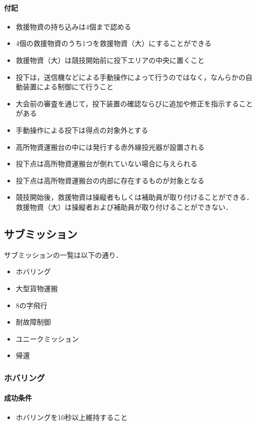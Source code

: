 \paragraph{付記}
\begin{itemize}
\item 救援物資の持ち込みは4個まで認める
\item 4個の救援物資のうち1つを救援物資（大）にすることができる
\item 救援物資（大）は競技開始前に投下エリアの中央に置くこと
\item 投下は，送信機などによる手動操作によって行うのではなく，なんらかの自動装置による制御にて行うこと
\item 大会前の審査を通じて，投下装置の確認ならびに追加や修正を指示することがある
\item 手動操作による投下は得点の対象外とする
\item 高所物資運搬台の中には発行する赤外線投光器が設置される
\item 投下点は高所物資運搬台が倒れていない場合に与えられる
\item 投下点は高所物資運搬台の内部に存在するものが対象となる
\item 競技開始後，救援物資は操縦者もしくは補助員が取り付けることができる．救援物資（大）は操縦者および補助員が取り付けることができない．
\end{itemize}

\subsection{サブミッション}
サブミッションの一覧は以下の通り．
\begin{itemize}
\item ホバリング
\item 大型貨物運搬
\item 8の字飛行
\item 耐故障制御
\item ユニークミッション
\item 帰還
\end{itemize}

\subsubsection{ホバリング}
\paragraph{成功条件}
\begin{itemize}
  \item ホバリングを10秒以上維持すること
\end{itemize}
